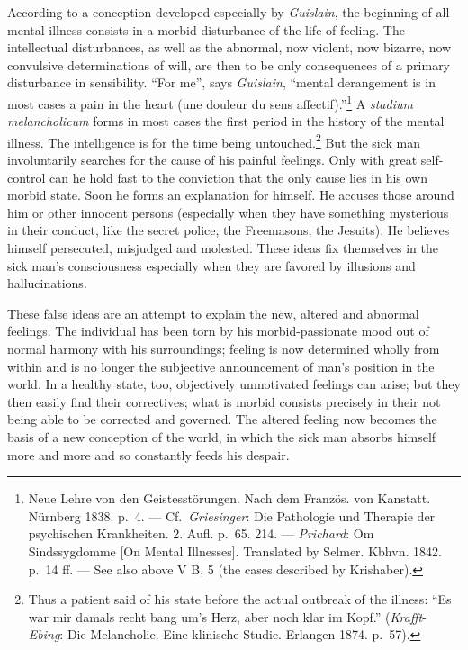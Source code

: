 \documentclass[12pt,a4paper]{book}
\newcommand{\opage}[1]{\marginnote{\footnotesize\textit{[#1]}}}
\begin{document}
According to a conception developed especially by \emph{Guislain}, the
beginning of all mental illness consists in a morbid disturbance of the
life of feeling. The intellectual disturbances, as well as the abnormal,
now violent, now bizarre, now convulsive determinations of will, are
then to be only consequences of a primary disturbance in sensibility.
``For me'', says \emph{Guislain}, ``mental derangement is in most cases a
pain in the heart (une douleur du sens affectif).''\footnote{Neue Lehre
von den Geistesstörungen. Nach dem Französ. von Kanstatt. Nürnberg 1838.
p.~4. --- Cf.\ \emph{Griesinger}: Die Pathologie und Therapie der
psychischen Krankheiten. 2. Aufl. p.~65. 214. --- \emph{Prichard}: Om
Sindssygdomme [On Mental Illnesses]. Translated by Selmer. Kbhvn. 1842.
p.~14 ff. --- See also above V B, 5 (the cases described by
Krishaber).} A \textit{stadium melancholicum} forms in
\opage{363}most cases the first period in the history of the mental
illness. The intelligence is for the time being untouched.\footnote{Thus
a patient said of his state before the actual outbreak of the illness:
``Es war mir damals recht bang um’s Herz, aber noch klar im Kopf.''
(\emph{Krafft}-\emph{Ebing}: Die Melancholie. Eine klinische Studie.
Erlangen 1874. p.~57).} But the sick man involuntarily searches for the
cause of his painful feelings. Only with great self-control can he hold
fast to the conviction that the only cause lies in his own morbid
state. Soon he forms an explanation for himself. He accuses those around
him or other innocent persons (especially when they have something
mysterious in their conduct, like the secret police, the Freemasons, the
Jesuits). He believes himself persecuted, misjudged and molested. These
ideas fix themselves in the sick man's consciousness especially when
they are favored by illusions and hallucinations.

These false ideas are an attempt to explain the new, altered and
abnormal feelings. The individual has been torn by his
morbid-passionate mood out of normal harmony with his surroundings;
feeling is now determined wholly from within and is no longer the
subjective announcement of man's position in the world. In a healthy
state, too, objectively unmotivated feelings can arise; but they then
easily find their correctives; what is morbid consists precisely in
their not being able to be corrected and governed. The altered feeling
now becomes the basis of a new conception of the world, in which the
sick man absorbs himself more and more and so constantly feeds his
despair.
\end{document}
